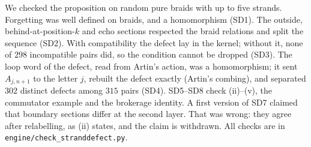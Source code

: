 \documentclass[11pt]{article}
\theoremstyle{definition}\newtheorem{definition}[theorem]{Definition}\newtheorem{remark}[theorem]{Remark}\newtheorem{example}[theorem]{Example}\newtheorem{problem}[theorem]{Open problem}\crefname{problem}{Problem}{Problems}
\begin{document}
We checked the proposition on random pure braids with up to five strands. Forgetting was well defined on braids, and a homomorphism (SD1). The outside, behind-at-position-$k$ and echo sections respected the braid relations and split the sequence (SD2). With compatibility the defect lay in the kernel; without it, none of $298$ incompatible pairs did, so the condition cannot be dropped (SD3). The loop word of the defect, read from Artin's action, was a homomorphism; it sent $A_{j,n+1}$ to the letter $j$, rebuilt the defect exactly (Artin's combing), and separated $302$ distinct defects among $315$ pairs (SD4). SD5--SD8 check (ii)--(v), the commutator example and the brokerage identity. A first version of SD7 claimed that boundary sections differ at the second layer. That was wrong: they agree after relabelling, as (ii) states, and the claim is withdrawn. All checks are in \texttt{engine/check\_stranddefect.py}.
\end{document}
